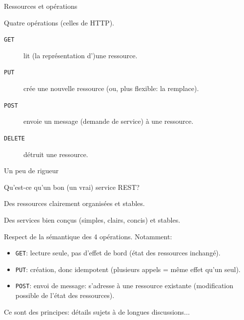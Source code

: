 \begin{frame}{Ressources et opérations}



\vfill

Quatre opérations (celles de HTTP).
\begin{description}
  \item[\texttt{GET}] \alert{lit} (la représentation d')une ressource.
  \item[\texttt{PUT}] \alert{crée} une nouvelle ressource (ou, plus flexible: la remplace).
  \item[\texttt{POST}] envoie un message (\alert{demande de service}) à une ressource.
  \item[\texttt{DELETE}] \alert{détruit} une ressource.
\end{description}
 
\end{frame}




\begin{frame}{Un peu de rigueur}

Qu'est-ce qu'un bon (un vrai) service REST?

\begin{redbullet}
  \item Des ressources clairement organisées \alert{et stables}.
  \item Des services bien conçus (simples, clairs, concis) \alert{et stables}.
  \item Respect de la sémantique des 4 opérations. Notamment:
  
  \begin{itemize}
    \item \texttt{GET}: \alert{lecture seule}, pas d'effet de bord (état des ressources inchangé).
    \item \texttt{PUT}: \alert{création}, donc idempotent (plusieurs appels = même effet qu'un seul). 
    \item \texttt{POST}: \alert{envoi de message}: s'adresse à une ressource existante (modification possible de l'état des ressources).
  \end{itemize}
\end{redbullet}

Ce sont des principes: détails sujets à de longues discussions...

\end{frame}

